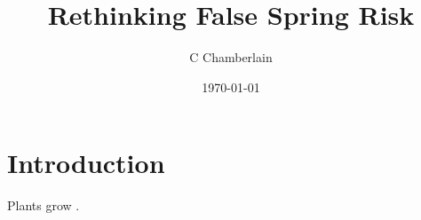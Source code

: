 \documentclass{article}
\begin{document}


\title{Rethinking False Spring Risk}
\author{C Chamberlain}
\date{\today}
\maketitle 

\renewcommand{\thetable}{\arabic{table}}
\renewcommand{\thefigure}{\arabic{figure}}
\renewcommand{\labelitemi}{$-$}
\section*{Introduction}

Plants grow \citep{frostbook}.




\end{document}
